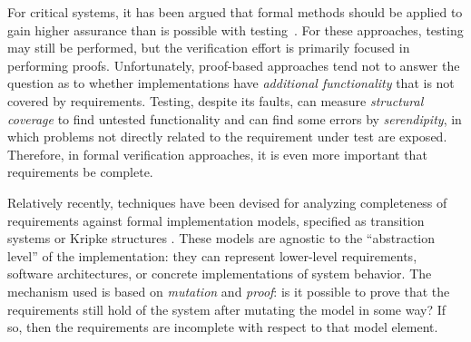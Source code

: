 

For critical systems, it has been argued that formal methods
should be applied to gain higher assurance than is possible with testing~\cite{Miller10:CACM,Rushby09:SEFM,Hardin09:Security}.  For these approaches, testing may still be performed, but the verification effort is primarily focused in performing proofs.  Unfortunately, proof-based approaches tend not to answer the question as to whether implementations have {\em additional functionality} that is not covered by requirements.  Testing, despite its faults, can measure {\em structural coverage} to find untested functionality and can find some errors by {\em serendipity}, in which problems not directly related to the requirement under test are exposed.  Therefore, in formal verification approaches, it is even more important that requirements be complete.

Relatively recently, techniques have been devised for analyzing completeness of requirements against formal implementation models, specified as transition systems or Kripke structures \cite{chockler2001practical,das2005formal, claessen2007coverage, grosse2007estimating}.  These models are agnostic to the ``abstraction level'' of the implementation: they can represent lower-level requirements, software architectures, or concrete implementations of system behavior.  The mechanism used is based on {\em mutation} and {\em proof}: is it possible to prove that the requirements still hold of the system after mutating the model in some way?  If so, then the requirements are incomplete with respect to that model element.

